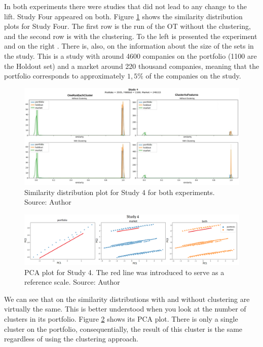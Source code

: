 In both experiments there were studies that did not lead to any change to the lift. Study Four appeared on both. Figure \ref{fig:study-4-comparsion} shows the similarity distribution plots for Study Four. The first row is the run of the OT without the clustering, and the second row is with the clustering. To the left is presented the \nameExperimentI{} experiment and on the right \nameExperimentII{}. There is, also, on the information about the size of the sets in the study. This is a study with around 4600 companies on the portfolio (1100 are the Holdout set) and a market around 220 thousand companies, meaning that the portfolio corresponds to approximately $1,5\%$ of the companies on the study.

\begin{figure}[h]
   \centering
   \includegraphics[width=\linewidth]{fig/ch4-study-4-comparsion.jpg}
   \caption{Similarity distribution plot for Study 4 for both experiments. Source: Author}
   \label{fig:study-4-comparsion}
\end{figure}

\begin{figure}[h]
   \centering
   \includegraphics[width=\linewidth]{fig/ch4-study-4-pca-plot.png}
   \caption{PCA plot for Study 4. The red line was introduced to serve as a reference scale. Source: Author}
   \label{fig:study-4-pca-plot}
\end{figure}

We can see that on \nameExperimentI{} the similarity distributions with and without clustering are virtually the same. This is better understood when you look at the number of clusters in its portfolio. Figure \ref{fig:study-4-pca-plot} shows its PCA plot. There is only a single cluster on the portfolio, consequentially, the result of this cluster is the same regardless of using the clustering approach.

